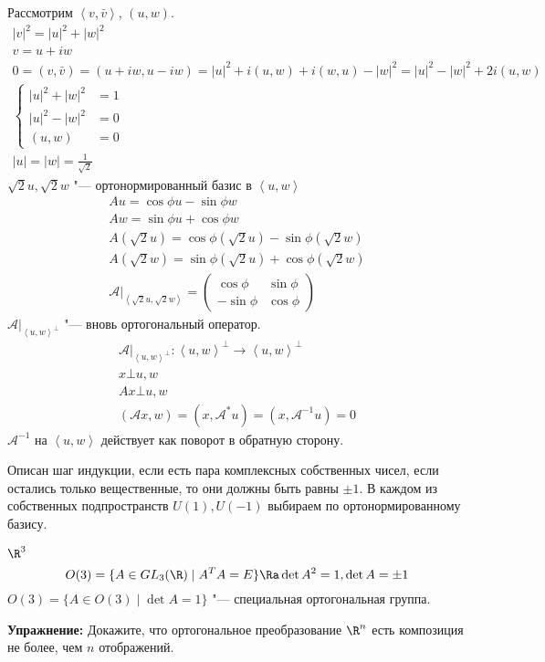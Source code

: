 Рассмотрим $\left<v, \bar v\right>$, $(u, w)$.
\begin{gather*}
	|v|^2 = |u|^2 + |w|^2 \\
	v = u + iw \\
	0 = (v, \bar v) = (u + iw, u - iw) = |u|^2 + i(u, w) + i(w, u) - |w|^2 = |u|^2 - |w|^2 + 2i(u, w) \\
	\left\{ \begin{aligned}
		|u|^2 + |w|^2 &= 1 \\
		|u|^2 - |w|^2 &= 0 \\
		(u, w) &= 0
	\end{aligned}\right. \\
	|u| = |w| = \frac1{\sqrt2}
\end{gather*}
$\sqrt2u, \sqrt2 w$ "--- ортонормированный базис в $\left<u, w\right>$
\begin{gather*}
	Au = \cos \phi u - \sin \phi w \\
	Aw = \sin \phi u + \cos \phi w \\
	A(\sqrt 2 u) = \cos \phi (\sqrt 2 u) - \sin \phi (\sqrt 2 w) \\
	A(\sqrt 2 w) = \sin \phi (\sqrt 2 u) + \cos \phi (\sqrt 2 w) \\
	\mathcal A|_{\left<\sqrt2 u, \sqrt2w\right>} = \begin{pmatrix}
 		 \cos \phi & \sin \phi \\
		-\sin \phi & \cos \phi
 	\end{pmatrix}
\end{gather*}
$\mathcal A|_{\left<u, w\right>^{\bot}}$ "--- вновь ортогональный оператор. 
\begin{gather*}
	\mathcal A|_{\left<u, w\right>^{\bot}} \colon \left<u, w\right>^{\bot}\to \left<u,w\right>^{\bot} \\
	x \bot u, w \\
	Ax \bot u, w \\
	(\mathcal Ax, w) = (x, \mathcal A^*u) = (x, \mathcal A^{-1}u) = 0
\end{gather*}
$\mathcal A^{-1}$ на $\left<u, w\right>$ действует как поворот в обратную сторону. 

Описан шаг индукции, если есть пара комплексных собственных чисел,
если остались только вещественные, то они должны быть равны $\pm 1$.
В каждом из собственных подпространств $U(1), U(-1)$ выбираем по ортонормированному базису. 

\begin{exmp}
	$\R^3$
	\[ O(3) = \{A \in GL_3(\R) \mid A^{T}A = E\} \Ra \det A^2 = 1, \det A = \pm 1 \]
	$O(3) = \{A \in O(3) \mid \det A = 1\} $ "--- специальная ортогональная группа. 
\end{exmp}

\textbf{Упражнение:}
Докажите, что ортогональное преобразование $\R^n$ есть композиция не более, чем $n$ отображений.
